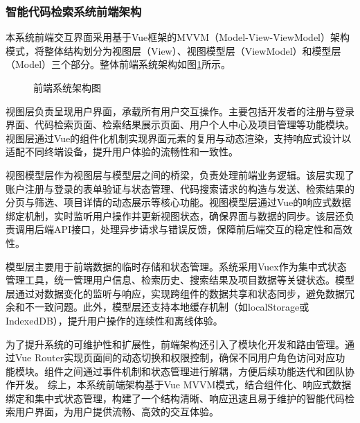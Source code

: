 \documentclass[UTF8,a4paper,12pt]{ctexart}
\numberwithin{equation}{section}
\begin{document}
\subsubsection{智能代码检索系统前端架构}
本系统前端交互界面采用基于Vue框架的MVVM（Model-View-ViewModel）架构模式，将整体结构划分为视图层（View）、视图模型层（ViewModel）和模型层（Model）三个部分。整体前端系统架构如图\ref{front_model}所示。
\begin{figure}[H]
	\caption{前端系统架构图}
	\label{front_model}
\end{figure}
视图层负责呈现用户界面，承载所有用户交互操作。主要包括开发者的注册与登录界面、代码检索页面、检索结果展示页面、用户个人中心及项目管理等功能模块。视图层通过Vue的组件化机制实现界面元素的复用与动态渲染，支持响应式设计以适配不同终端设备，提升用户体验的流畅性和一致性。\par
视图模型层作为视图层与模型层之间的桥梁，负责处理前端业务逻辑。该层实现了账户注册与登录的表单验证与状态管理、代码搜索请求的构造与发送、检索结果的分页与筛选、项目详情的动态展示等核心功能。视图模型层通过Vue的响应式数据绑定机制，实时监听用户操作并更新视图状态，确保界面与数据的同步。该层还负责调用后端API接口，处理异步请求与错误反馈，保障前后端交互的稳定性和高效性。\par
模型层主要用于前端数据的临时存储和状态管理。系统采用Vuex作为集中式状态管理工具，统一管理用户信息、检索历史、搜索结果及项目数据等关键状态。模型层通过对数据变化的监听与响应，实现跨组件的数据共享和状态同步，避免数据冗余和不一致问题。此外，模型层还支持本地缓存机制（如localStorage或IndexedDB），提升用户操作的连续性和离线体验。\par
为了提升系统的可维护性和扩展性，前端架构还引入了模块化开发和路由管理。通过Vue Router实现页面间的动态切换和权限控制，确保不同用户角色访问对应功能模块。组件之间通过事件机制和状态管理进行解耦，方便后续功能迭代和团队协作开发。
综上，本系统前端架构基于Vue MVVM模式，结合组件化、响应式数据绑定和集中式状态管理，构建了一个结构清晰、响应迅速且易于维护的智能代码检索用户界面，为用户提供流畅、高效的交互体验。
\end{document}
